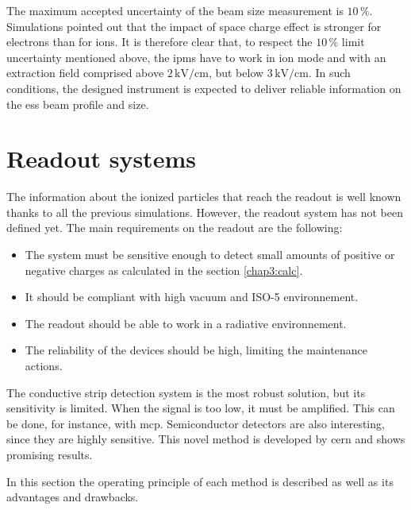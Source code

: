 \begin{refsection}
  The maximum accepted uncertainty of the beam size measurement is $10\,\mathrm{\%}$. Simulations pointed out that the impact of space charge effect is stronger for electrons than for ions. It is therefore clear that, to respect the $10\,\mathrm{\%}$ limit uncertainty mentioned above, the \acrshort{ipm}s have to work in ion mode and with an extraction field comprised above $2\,\mathrm{kV/cm}$, but below $3\,\mathrm{kV/cm}$. In such conditions, the designed instrument is expected to deliver reliable information on the \acrshort{ess} beam profile and size.

  \section{Readout systems}
  The information about the ionized particles that reach the readout is well known thanks to all the previous simulations. However, the readout system has not been defined yet. The main requirements on the readout are the following:
  \begin{itemize}
    \item The system must be sensitive enough to detect small amounts of positive or negative charges as calculated in the section \ref{chap3:calc}.
    \item It should be compliant with high vacuum and ISO-5 environnement.
    \item The readout should be able to work in a radiative environnement.
    \item The reliability of the devices should be high, limiting the maintenance actions.
  \end{itemize}

  The conductive strip detection system is the most robust solution, but its sensitivity is limited. When the signal is too low, it must be amplified. This can be done, for instance, with \acrfull{mcp}. Semiconductor detectors are also interesting, since they are highly sensitive. This novel method is developed by \acrshort{cern} and shows promising results.

  In this section the operating principle of each method is described as well as its advantages and drawbacks.


\end{refsection}
